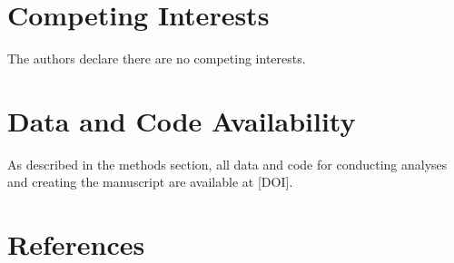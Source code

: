 \documentclass[
]{article}
\begin{document}
\hypertarget{competing-interests}{%
\section*{Competing Interests}\label{competing-interests}}

The authors declare there are no competing interests.

\hypertarget{data-and-code-availability}{%
\section*{Data and Code Availability}\label{data-and-code-availability}}

As described in the methods section, all data and code for conducting analyses and creating the manuscript are available at {[}DOI{]}.

\pagebreak

\hypertarget{references}{%
\section*{References}\label{references}}
\end{document}
